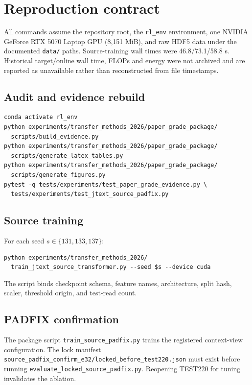 \documentclass[10pt]{article}
\newcommand{\code}[1]{\nolinkurl{#1}}
\begin{document}
\section{Reproduction contract}

All commands assume the repository root, the \code{rl\_env} environment, one NVIDIA GeForce RTX 5070 Laptop GPU (8,151 MiB), and raw HDF5 data under the documented \code{data/} paths.  Source-training wall times were 46.8/73.1/58.8 s.  Historical target/online wall time, FLOPs and energy were not archived and are reported as unavailable rather than reconstructed from file timestamps.

\subsection{Audit and evidence rebuild}

\begin{verbatim}
conda activate rl_env
python experiments/transfer_methods_2026/paper_grade_package/
  scripts/build_evidence.py
python experiments/transfer_methods_2026/paper_grade_package/
  scripts/generate_latex_tables.py
python experiments/transfer_methods_2026/paper_grade_package/
  scripts/generate_figures.py
pytest -q tests/experiments/test_paper_grade_evidence.py \
  tests/experiments/test_jtext_source_padfix.py
\end{verbatim}

\subsection{Source training}

For each seed $s\in\{131,133,137\}$:
\begin{verbatim}
python experiments/transfer_methods_2026/
  train_jtext_source_transformer.py --seed $s --device cuda
\end{verbatim}
The script binds checkpoint schema, feature names, architecture, split hash, scaler, threshold origin, and test-read count.

\subsection{PADFIX confirmation}

The package script \code{train\_source\_padfix.py} trains the registered context-view configuration.  The lock manifest \code{source\_padfix\_confirm\_e32/locked\_before\_test220.json} must exist before running \code{evaluate\_locked\_source\_padfix.py}.  Reopening TEST220 for tuning invalidates the ablation.
\end{document}
